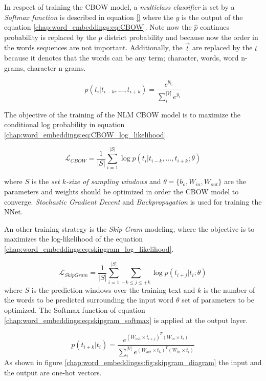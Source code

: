 In respect of training the CBOW model, a \textit{multiclass classifier} is set by a \textit{Softmax function} is described in equation \ref{} where the $y$ is the output of the equation \ref{chap:word_embeddings:eq:CBOW}. Note now the $\hat{p}$ continues probability is replaced by the $p$ district probability and because now the order in the words sequences are not important. Additionally, the $\vec{t}$ are replaced by the $t$ because it denotes that the words can be any term; character, words, word n-grams, character n-grams. 

\begin{equation} \label{chap:word_embeddings:eq:CBOW_softmax}
	p(t_{i}|t_{i-k},...,t_{i+k}) = \frac{e^{y_{t_{i}}}}{\sum^{|V|}_{i}{e^{y_i}}}
\end{equation}

The objective of the training of the NLM CBOW model is to maximize the conditional log probability in equation \ref{chap:word_embeddings:eq:CBOW_log_likelihood}. 

\begin{equation} \label{chap:word_embeddings:eq:CBOW_log_likelihood}
	 \mathcal{L}_{CBOW} = \frac{1}{|S|} \sum_{i=1}^{|S|}{\log{p(t_{i}|t_{i-k}, ... ,t_{i+k};\theta)}}
\end{equation}


\noindent
where $S$ is the \textit{set $k$-size of sampling windows} and  $\theta=\{b_{o},W_{in},W_{out}\}$ are the parameters and weights should be optimized in order the CBOW model to converge. \textit{Stochastic Gradient Decent} and \textit{Backpropagation} is used for training the NNet.

An other training strategy is the \textit{Skip-Gram} modeling, where the objective is to maximizes the log-likelihood of the equation \ref{chap:word_embeddings:eq:skipgram_log_likelihood}.

\begin{equation} \label{chap:word_embeddings:eq:skipgram_log_likelihood}
	 \mathcal{L}_{SkipGram} = \frac{1}{|S|} \sum_{i=1}^{|S|}{ \sum_{-k \leq j \leq +k}{ \log {p(t_{i+j}|t_{i};\theta)}  } }
\end{equation}
\noindent
where $S$ is the prediction windows over the training text and $k$ is the number of the words to be predicted surrounding the input word $\theta$ set of parameters to be optimized. The Softmax function of equation \ref{chap:word_embeddings:eq:skipgram_softmax} is applied at the output layer.

\begin{equation} \label{chap:word_embeddings:eq:skipgram_softmax}
	p(t_{i+k}|t_{i}) = \frac{ e^{(W_{out}  \times  t_{i+j})^{T} (W_{in} \times  t_{i})}}{\sum^{|V|}_{i}{ e^{(W_{out}  \times  t_{k})^{T} (W_{in} \times  t_{i})}}} 
\end{equation}
As shown in figure \ref{chap:word_embeddingss:fig:skipgram_diagram} the input and the output are one-hot vectors.

